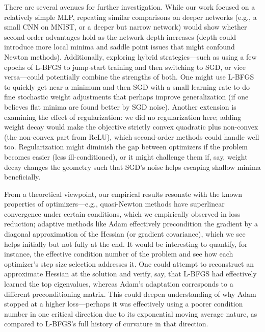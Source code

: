 \documentclass[12pt]{article}
\begin{document}
There are several avenues for further investigation. While our work focused on a relatively simple MLP, repeating similar comparisons on deeper networks (e.g., a small CNN on MNIST, or a deeper but narrow network) would show whether second-order advantages hold as the network depth increases (depth could introduce more local minima and saddle point issues that might confound Newton methods). Additionally, exploring hybrid strategies—such as using a few epochs of L-BFGS to jump-start training and then switching to SGD, or vice versa—could potentially combine the strengths of both. One might use L-BFGS to quickly get near a minimum and then SGD with a small learning rate to do fine stochastic weight adjustments that perhaps improve generalization (if one believes flat minima are found better by SGD noise). Another extension is examining the effect of regularization: we did no regularization here; adding weight decay would make the objective strictly convex quadratic plus non-convex (the non-convex part from ReLU), which second-order methods could handle well too. Regularization might diminish the gap between optimizers if the problem becomes easier (less ill-conditioned), or it might challenge them if, say, weight decay changes the geometry such that SGD’s noise helps escaping shallow minima beneficially.

From a theoretical viewpoint, our empirical results resonate with the known properties of optimizers—e.g., quasi-Newton methods have superlinear convergence under certain conditions, which we empirically observed in loss reduction; adaptive methods like Adam effectively precondition the gradient by a diagonal approximation of the Hessian (or gradient covariance), which we see helps initially but not fully at the end. It would be interesting to quantify, for instance, the effective condition number of the problem and see how each optimizer’s step size selection addresses it. One could attempt to reconstruct an approximate Hessian at the solution and verify, say, that L-BFGS had effectively learned the top eigenvalues, whereas Adam’s adaptation corresponds to a different preconditioning matrix. This could deepen understanding of why Adam stopped at a higher loss—perhaps it was effectively using a poorer condition number in one critical direction due to its exponential moving average nature, as compared to L-BFGS’s full history of curvature in that direction.
\end{document}
